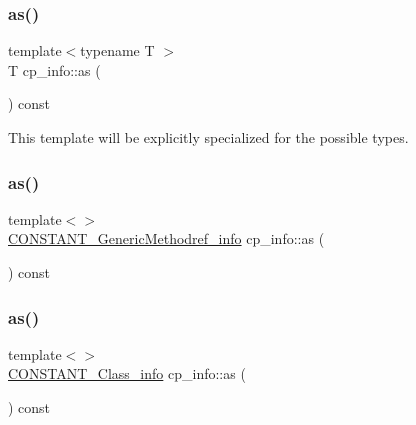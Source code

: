 \subsubsection{\texorpdfstring{as()}{as()}\hspace{0.1cm}{\footnotesize\ttfamily [1/4]}}
{\footnotesize\ttfamily template$<$typename T $>$ \\
T cp\+\_\+info\+::as (\begin{DoxyParamCaption}{ }\end{DoxyParamCaption}) const}



This template will be explicitly specialized for the possible types. 

\mbox{\label{structcp__info_a032c6014839b743ea813f1e69df0e478}} 
\subsubsection{\texorpdfstring{as()}{as()}\hspace{0.1cm}{\footnotesize\ttfamily [2/4]}}
{\footnotesize\ttfamily template$<$$>$ \\
\hyperlink{structCONSTANT__GenericMethodref__info}{C\+O\+N\+S\+T\+A\+N\+T\+\_\+\+Generic\+Methodref\+\_\+info} cp\+\_\+info\+::as (\begin{DoxyParamCaption}{ }\end{DoxyParamCaption}) const}

\mbox{\label{structcp__info_aa1c10a3fe7a296f25f0f25eb30d96979}} 
\subsubsection{\texorpdfstring{as()}{as()}\hspace{0.1cm}{\footnotesize\ttfamily [3/4]}}
{\footnotesize\ttfamily template$<$$>$ \\
\hyperlink{structCONSTANT__Class__info}{C\+O\+N\+S\+T\+A\+N\+T\+\_\+\+Class\+\_\+info} cp\+\_\+info\+::as (\begin{DoxyParamCaption}{ }\end{DoxyParamCaption}) const}

\mbox{\label{structcp__info_af14ec722b429cf5cb5b7fc52a7a955b8}} 
